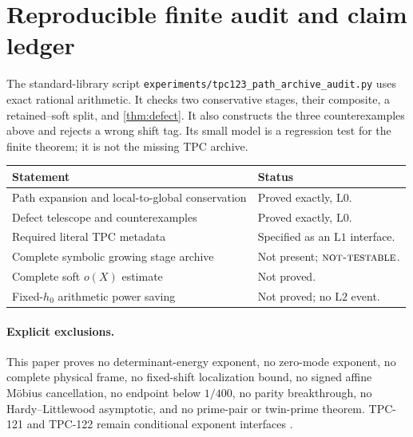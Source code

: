 \documentclass[11pt]{article}
\theoremstyle{definition}
\theoremstyle{remark}
\newcommand{\Lzero}{\mathrm{L0}}
\newcommand{\Lone}{\mathrm{L1}}
\newcommand{\Ltwo}{\mathrm{L2}}
\newcommand{\NT}{\textsc{not-testable}}
\begin{document}
\section{Reproducible finite audit and claim ledger}

The standard-library script
\texttt{experiments/tpc123\_path\_archive\_audit.py} uses exact
rational arithmetic.  It checks two conservative stages, their
composite, a retained--soft split, and \cref{thm:defect}.  It also
constructs the three counterexamples above and rejects a wrong shift
tag.  Its small model is a regression test for the finite theorem; it
is not the missing TPC archive.

\begin{center}
\small
\begin{tabularx}{\textwidth}{@{}P{0.39\textwidth}Y@{}}
\toprule
Statement & Status\\
\midrule
Path expansion and local-to-global conservation
& Proved exactly, \(\Lzero\).\\
Defect telescope and counterexamples
& Proved exactly, \(\Lzero\).\\
Required literal TPC metadata
& Specified as an \(\Lone\) interface.\\
Complete symbolic growing stage archive
& Not present; \(\NT\).\\
Complete soft \(o(X)\) estimate
& Not proved.\\
Fixed-\(h_0\) arithmetic power saving
& Not proved; no \(\Ltwo\) event.\\
\bottomrule
\end{tabularx}
\end{center}

\paragraph{Explicit exclusions.}
This paper proves no determinant-energy exponent, no zero-mode
exponent, no complete physical frame, no fixed-shift localization
bound, no signed affine M\"obius cancellation, no endpoint below
\(1/400\), no parity breakthrough, no Hardy--Littlewood asymptotic,
and no prime-pair or twin-prime theorem.  TPC-121 and TPC-122 remain
conditional exponent interfaces \citep{WangTPC120,WangTPC121,WangTPC122}.

\begingroup
\small
\setlength{\bibsep}{2pt plus 0.3ex}
\sloppy


\endgroup
\end{document}
